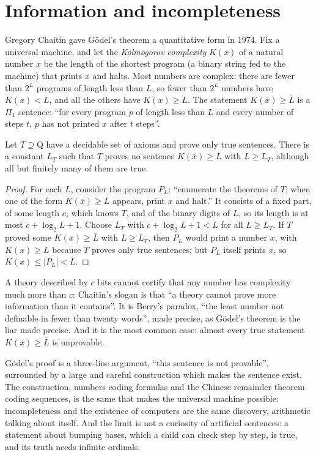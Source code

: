\section{Information and incompleteness}\label{sec:chaitin}

Gregory Chaitin gave Gödel's theorem a quantitative form in 1974. Fix a universal machine, and let the \emph{Kolmogorov complexity} $K(x)$ of a natural number $x$ be the length of the shortest program (a binary string fed to the machine) that prints $x$ and halts. Most numbers are complex: there are fewer than $2^L$ programs of length less than $L$, so fewer than $2^L$ numbers have $K(x)<L$, and all the others have $K(x)\ge L$. The statement $K(\overline x)\ge\overline L$ is a $\Pi_1$ sentence: ``for every program $p$ of length less than $L$ and every number of steps $t$, $p$ has not printed $x$ after $t$ steps''.

\begin{theorem}[Chaitin, 1974]\label{thm:chaitin}
Let $T\supseteq\mathrm Q$ have a decidable set of axioms and prove only true sentences. There is a constant $L_T$ such that $T$ proves no sentence $K(\overline x)\ge\overline L$ with $L\ge L_T$, although all but finitely many of them are true.
\end{theorem}

\begin{proof}
For each $L$, consider the program $P_L$: ``enumerate the theorems of $T$; when one of the form $K(\overline x)\ge\overline L$ appears, print $x$ and halt.'' It consists of a fixed part, of some length $c$, which knows $T$, and of the binary digits of $L$, so its length is at most $c+\log_2L+1$. Choose $L_T$ with $c+\log_2L+1<L$ for all $L\ge L_T$. If $T$ proved some $K(\overline x)\ge\overline L$ with $L\ge L_T$, then $P_L$ would print a number $x$, with $K(x)\ge L$ because $T$ proves only true sentences; but $P_L$ itself prints $x$, so $K(x)\le|P_L|<L$.
\end{proof}

A theory described by $c$ bits cannot certify that any number has complexity much more than $c$: Chaitin's slogan is that ``a theory cannot prove more information than it contains''. It is Berry's paradox, ``the least number not definable in fewer than twenty words'', made precise, as Gödel's theorem is the liar made precise. And it is the most common case: almost every true statement $K(\overline x)\ge\overline L$ is unprovable.

\begin{beauty}
Gödel's proof is a three-line argument, ``this sentence is not provable'', surrounded by a large and careful construction which makes the sentence exist. The construction, numbers coding formulas and the Chinese remainder theorem coding sequences, is the same that makes the universal machine possible: incompleteness and the existence of computers are the same discovery, arithmetic talking about itself. And the limit is not a curiosity of artificial sentences: a statement about bumping bases, which a child can check step by step, is true, and its truth needs infinite ordinals.
\end{beauty}

